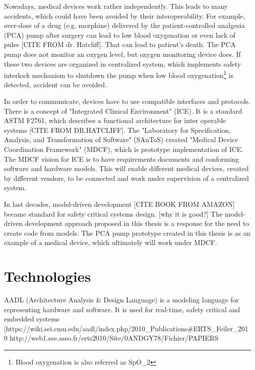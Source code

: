 Nowadays, medical devices work rather independently. This leads to many accidents, which could have been avoided by their interoperability. For example, over-dose of a drug (e.g. morphine) delivered by the patient-controlled analgesia (PCA) pump after surgery can lead to low blood oxygenation or even lack of pulse [CITE FROM dr. Hatcliff]. That can lead to patient's death. The PCA pump does not monitor an oxygen level, but oxygen monitoring device does. If these two devices are organized in centralized system, which implements safety interlock mechanism to shutdown the pump when low blood oxygenation\footnote{Blood oxygenation is also referred as SpO_2} is detected, accident can be avoided. 

In order to communicate, devices have to use compatible interfaces and protocols. There is a concept of "Integrated Clinical Environment" (ICE). It is a standard ASTM F2761, which describes a functional architecture for inter operable systems [CITE FROM DR.HATCLIFF]. The "Laboratory for Specification, Analysis, and Transformation of Software" (SAnToS) created "Medical Device Coordination Framework" (MDCF), which is prototype implementation of ICE. The MDCF vision for ICE is to have requirements documents and conforming software and hardware models. This will enable different medical devices, created by different vendors, to be connected and work under supervision of a centralized system.

In last decades, model-driven development [CITE BOOK FROM AMAZON] became standard for safety critical systems design. [why it is good?] The model-driven development approach proposed in this thesis is a response for the need to create code from models. The PCA pump prototype created in this thesis is as an example of a medical device, which ultimately will work under MDCF.


\section{Technologies}
\label{introduction:technologies}

AADL (Architecture Analysis \& Design Language) \cite{AadlBook} is a modeling language for representing hardware and software. It is used for real-time, safety critical and embedded systems [https://wiki.sei.cmu.edu/aadl/index.php/2010_Publications#ERTS_Feiler_2010 http://web1.see.asso.fr/erts2010/Site/0ANDGY78/Fichier/PAPIERS%

